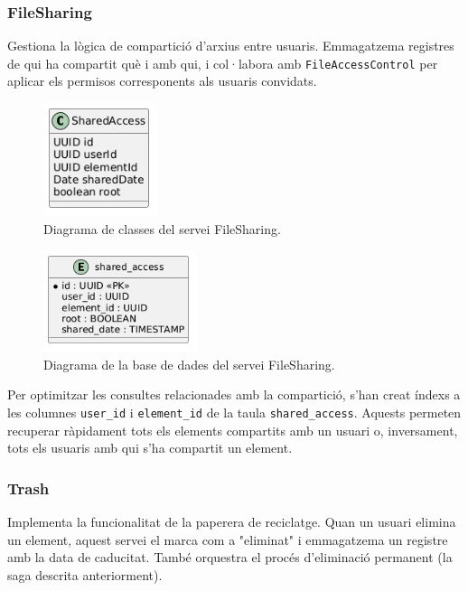\subsubsection{FileSharing}
Gestiona la lògica de compartició d'arxius entre usuaris. Emmagatzema registres de qui ha compartit què i amb qui, i col·labora amb \texttt{FileAccessControl} per aplicar els permisos corresponents als usuaris convidats.

\begin{figure}[H]
    \centering
    \includegraphics[width=0.3\textwidth]{Figures/diagrama_clases_fileSharing.png}
    \caption{Diagrama de classes del servei FileSharing.}
    \label{fig:filesharing_classes}
\end{figure}

\begin{figure}[H]
    \centering
    \includegraphics[width=0.4\textwidth]{Figures/diagrama_bd_fileSharing.png}
    \caption{Diagrama de la base de dades del servei FileSharing.}
    \label{fig:filesharing_db}
\end{figure}

Per optimitzar les consultes relacionades amb la compartició, s'han creat índexs a les columnes \texttt{user\_id} i \texttt{element\_id} de la taula \texttt{shared\_access}. Aquests permeten recuperar ràpidament tots els elements compartits amb un usuari o, inversament, tots els usuaris amb qui s'ha compartit un element.

\subsubsection{Trash}
Implementa la funcionalitat de la paperera de reciclatge. Quan un usuari elimina un element, aquest servei el marca com a "eliminat" i emmagatzema un registre amb la data de caducitat. També orquestra el procés d'eliminació permanent (la saga descrita anteriorment).

